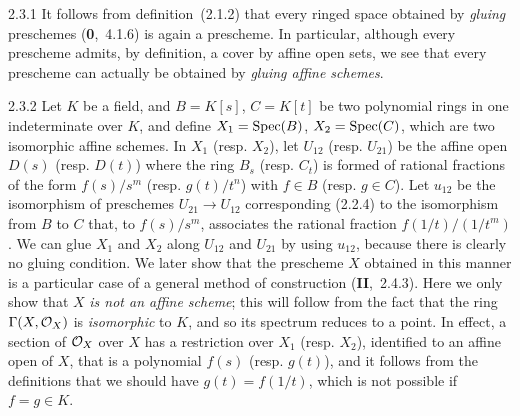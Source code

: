 \documentclass[../main.tex]{subfiles}
\begin{document}
\begin{env}{2.3.1}
    It follows from definition~(2.1.2) that every ringed space obtained by \emph{gluing} preschemes (\textbf{0},~4.1.6) is again a prescheme.
    In particular, although every prescheme admits, by definition, a cover by affine open sets, we see that every prescheme can actually be obtained by \emph{gluing affine schemes}.
\end{env}

\begin{env}[Example]{2.3.2}
    Let $K$ be a field, and $B=K[s]$, $C=K[t]$ be two polynomial rings in one indeterminate over $K$, and define $X_1=\operatorname{Spec}(B)$, $X_2=\operatorname{Spec}(C)$, which are two isomorphic affine schemes.
    In $X_1$ (resp. $X_2$), let $U_{12}$ (resp. $U_{21}$) be the affine open $D(s)$ (resp. $D(t)$) where the ring $B_s$ (resp. $C_t$) is formed of rational fractions of the form $f(s)/s^m$ (resp. $g(t)/t^n$) with $f\in B$ (resp. $g\in C$).
    Let $u_{12}$ be the isomorphism of preschemes $U_{21}\to U_{12}$ corresponding (2.2.4) to the isomorphism from $B$ to $C$ that, to $f(s)/s^m$, associates the rational fraction $f(1/t)/(1/t^m)$.
    We can glue $X_1$ and $X_2$ along $U_{12}$ and $U_{21}$ by using $u_{12}$, because there is clearly no gluing condition.
    We later show that the prescheme $X$ obtained in this manner is a particular case of a general method of construction (\textbf{II},~2.4.3).
    Here we only show that $X$ \emph{is not an affine scheme}; this will follow from the fact that the ring $\Gamma(X,\mathcal{O}_X)$ is \emph{isomorphic} to $K$, and so its spectrum reduces to a point.
    In effect, a section of $\mathcal{O}_X$ over $X$ has a restriction over $X_1$ (resp. $X_2$), identified to an affine open of $X$, that is a polynomial $f(s)$ (resp. $g(t)$), and it follows from the definitions that we should have $g(t)=f(1/t)$, which is not possible if $f=g\in K$.
\end{env}
\end{document}
